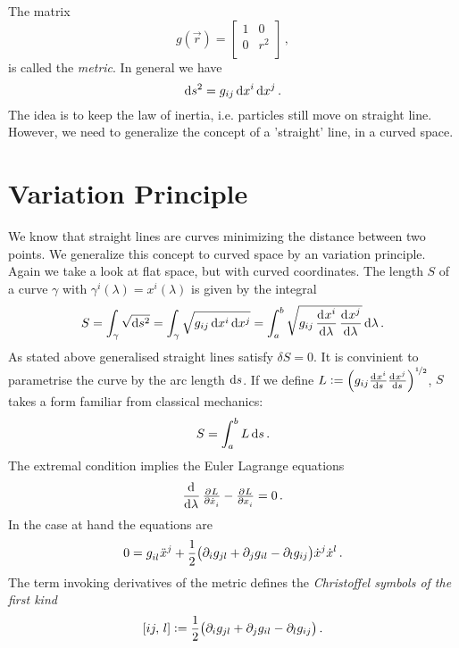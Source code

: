 The matrix
\begin{equation}
    g(\vec{r})=
    \begin{bmatrix}
        1& 0\\
        0& r^2\\
    \end{bmatrix}\, ,
\end{equation}
is called the \emph{metric}.
In general we have
\begin{equation}
    \dif s^2 = g_{ij}\dif x^i\dif x^j\, .
\end{equation}
The idea is to keep the law of inertia, i.e. particles still move on straight
line. However, we need to generalize the concept of a 'straight' line, in a
curved space.
\section{Variation Principle}
We know that straight lines are curves minimizing the distance between two
points. We generalize this concept to curved space by an variation principle.
Again we take a look at flat space, but with curved coordinates.
The length $S$ of a curve $\gamma$ with $\gamma^i(\lambda) = x^i(\lambda)$ is
given by the integral
\begin{equation}
    S=\int_{\gamma}\sqrt{\dif s^2} =
    \int_{\gamma}\sqrt{g_{ij}\dif x^i\dif
    x^j}=\int_{a}^{b}\sqrt{g_{ij}\dod{x^i}{\lambda} \dod{x^j}{\lambda}}\dif
    \lambda\, .
\end{equation}
As stated above generalised straight lines satisfy $\delta S = 0$. It is
convinient to parametrise the curve by the arc length $\dif s$. If we define
$L:=\left(g_{ij}\od{x^i}{s} \od{x^j}{s}\right)^{\nicefrac{1}{2}}$, $S$ takes a
form familiar from classical mechanics:
\begin{equation}
    S=\int_a^b L\dif s\, .
\end{equation}
The extremal condition implies the Euler Lagrange equations
\begin{equation}
    \dod{}{\lambda}\pd{L}{\dot{x}_i}-\pd{L}{x_i}
=0\, .		\end{equation}
In the case at hand the equations are
\begin{equation}
    0=\tensor{g}{_i_l}\tensor{\ddot{x}}{^j}+\frac{1}{2} \left(\partial_i g_{jl} + \partial_j g_{il} -
    \partial_l g_{ij}\right)\dot{x}^j\dot{x}^l\, . \label{eq:PreGeo}
\end{equation}
The term invoking derivatives of the metric defines the \emph{Christoffel
symbols of the first kind}
\begin{equation}
    \csym{i}{j}{l}:=\frac{1}{2} \left(\partial_i g_{jl} + \partial_j g_{il} -
    \partial_l g_{ij}\right)\, .
\end{equation}

